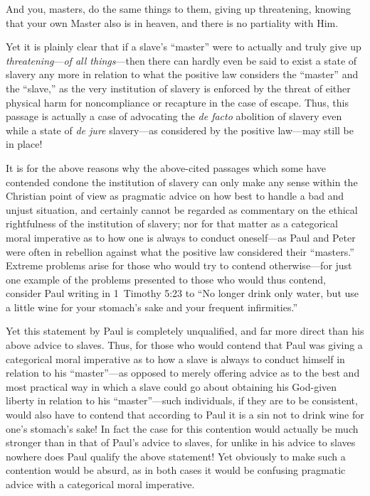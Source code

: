 \documentclass[letterpaper,12pt]{article}
\newenvironment{squote}
  {\small\quote}
  {\endquote\normalsize}
\begin{document}
\begin{squote}
And you, masters, do the same things to them, giving up threatening, knowing that your own Master also is in heaven, and there is no partiality with Him.
\end{squote}

Yet it is plainly clear that if a slave's ``master'' were to actually and truly give up \emph{threatening}---\emph{of all things}---then there can hardly even be said to exist a state of slavery any more in relation to what the positive law considers the ``master'' and the ``slave,'' as the very institution of slavery is enforced by the threat of either physical harm for noncompliance or recapture in the case of escape. Thus, this passage is actually a case of advocating the \emph{de facto} abolition of slavery even while a state of \emph{de jure} slavery---as considered by the positive law---may still be in place!

It is for the above reasons why the above-cited passages which some have contended condone the institution of slavery can only make any sense within the Christian point of view as pragmatic advice on how best to handle a bad and unjust situation, and certainly cannot be regarded as commentary on the ethical rightfulness of the institution of slavery; nor for that matter as a categorical moral imperative as to how one is always to conduct oneself---as Paul and Peter were often in rebellion against what the positive law considered their ``masters.'' Extreme problems arise for those who would try to contend otherwise---for just one example of the problems presented to those who would thus contend, consider Paul writing in 1~Timothy 5:23 to ``No longer drink only water, but use a little wine for your stomach's sake and your frequent infirmities.''

Yet this statement by Paul is completely unqualified, and far more direct than his above advice to slaves. Thus, for those who would contend that Paul was giving a categorical moral imperative as to how a slave is always to conduct himself in relation to his ``master''---as opposed to merely offering advice as to the best and most practical way in which a slave could go about obtaining his God-given liberty in relation to his ``master''---such individuals, if they are to be consistent, would also have to contend that according to Paul it is a sin not to drink wine for one's stomach's sake! In fact the case for this contention would actually be much stronger than in that of Paul's advice to slaves, for unlike in his advice to slaves nowhere does Paul qualify the above statement! Yet obviously to make such a contention would be absurd, as in both cases it would be confusing pragmatic advice with a categorical moral imperative.
\end{document}
